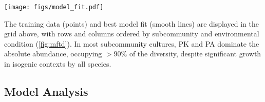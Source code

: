 \documentclass[twocolumn, 10pt]{report}
\newenvironment{Figure}
  {\par\medskip\noindent\minipage{\linewidth}}
  {\endminipage\par\medskip}
\begin{document}
{%


\begin{Figure}
    \centering
    \texttt{[image: figs/model\_fit.pdf]}
    \centering
    \label{fig:mftd}
\end{Figure}

The training data (points) and best model fit (smooth lines) are displayed in the grid above, with rows and columns ordered by subcommunity and environmental condition (\ref{fig:mftd}). In most subcommunity cultures, PK and PA dominate the absolute abundance, occupying $> 90\%$ of the diversity, despite significant growth in isogenic contexts by all species.

\subsection*{Model Analysis}

}
\end{document}
